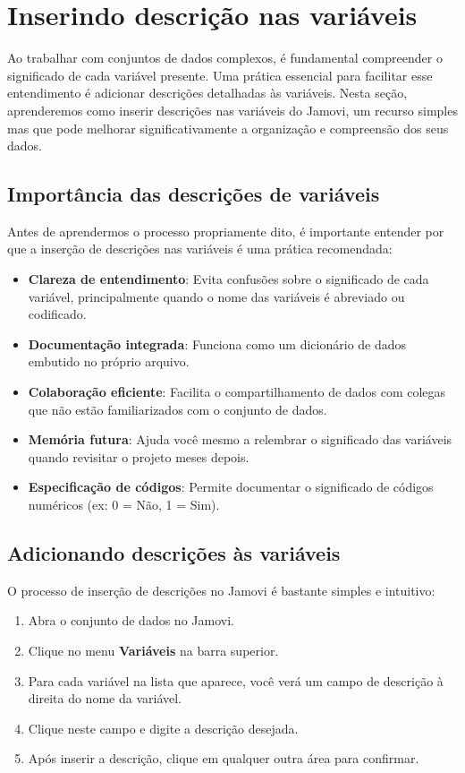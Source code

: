 \section{Inserindo descrição nas variáveis}

Ao trabalhar com conjuntos de dados complexos, é fundamental compreender o significado de cada variável presente. Uma prática essencial para facilitar esse entendimento é adicionar descrições detalhadas às variáveis. Nesta seção, aprenderemos como inserir descrições nas variáveis do Jamovi, um recurso simples mas que pode melhorar significativamente a organização e compreensão dos seus dados.

\subsection{Importância das descrições de variáveis}

Antes de aprendermos o processo propriamente dito, é importante entender por que a inserção de descrições nas variáveis é uma prática recomendada:

\begin{itemize}
    \item \textbf{Clareza de entendimento}: Evita confusões sobre o significado de cada variável, principalmente quando o nome das variáveis é abreviado ou codificado.
    \item \textbf{Documentação integrada}: Funciona como um dicionário de dados embutido no próprio arquivo.
    \item \textbf{Colaboração eficiente}: Facilita o compartilhamento de dados com colegas que não estão familiarizados com o conjunto de dados.
    \item \textbf{Memória futura}: Ajuda você mesmo a relembrar o significado das variáveis quando revisitar o projeto meses depois.
    \item \textbf{Especificação de códigos}: Permite documentar o significado de códigos numéricos (ex: 0 = Não, 1 = Sim).
\end{itemize}

\subsection{Adicionando descrições às variáveis}

O processo de inserção de descrições no Jamovi é bastante simples e intuitivo:

\begin{enumerate}
    \item Abra o conjunto de dados no Jamovi.
    \item Clique no menu \textbf{Variáveis} na barra superior.
    \item Para cada variável na lista que aparece, você verá um campo de descrição à direita do nome da variável.
    \item Clique neste campo e digite a descrição desejada.
    \item Após inserir a descrição, clique em qualquer outra área para confirmar.
\end{enumerate}


